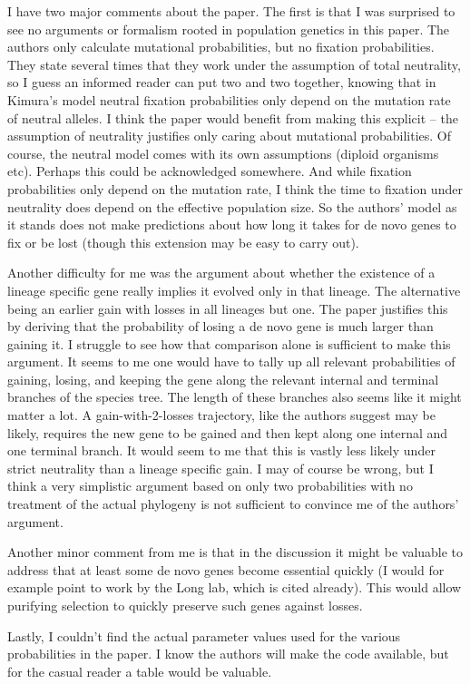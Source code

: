 \documentclass[12pt,a4paper]{article}
\begin{document}
I have two major comments about the paper. The first is that I was surprised to see no arguments or formalism rooted in population genetics in this paper. The authors only calculate mutational probabilities, but no fixation probabilities. They state several times that they work under the assumption of total neutrality, so I guess an informed reader can put two and two together, knowing that in Kimura's model neutral fixation probabilities only depend on the mutation rate of neutral alleles. I think the paper would benefit from making this explicit -- the assumption of neutrality justifies only caring about mutational probabilities. Of course, the neutral model comes with its own assumptions (diploid organisms  etc). Perhaps this could be acknowledged somewhere. And while fixation probabilities only depend on the mutation rate, I think the time to fixation under neutrality does depend on the effective population size. So the authors' model as it stands does not make predictions about how long it takes for de novo genes to fix or be lost (though this extension may be easy to carry out).

Another difficulty for me was the argument about whether the existence of a lineage specific gene really implies it evolved only in that lineage. The alternative being an earlier gain with losses in all lineages but one. The paper justifies this by deriving that the probability of losing a de novo gene is much larger than gaining it. I struggle to see how that comparison alone is sufficient to make this argument. It seems to me one would have to tally up all relevant probabilities of gaining, losing, and keeping the gene along the relevant internal and terminal branches of the species tree. The length of these branches also seems like it might matter a lot. A gain-with-2-losses trajectory, like the authors suggest may be likely, requires the new gene to be gained and then kept along one internal and one terminal branch. It would seem to me that this is vastly less likely under strict neutrality than a lineage specific gain. I may of course be wrong, but I think a very simplistic argument based on only two probabilities with no treatment of the actual phylogeny is not sufficient to convince me of the authors' argument.

Another minor comment from me is that in the discussion it might be valuable to address that at least some de novo genes become essential quickly (I would for example point to work by the Long lab, which is cited already). This would allow purifying selection to quickly preserve such genes against losses.

Lastly, I couldn't find the actual parameter values used for the various probabilities in the paper. I know the authors will make the code available, but for the casual reader a table would be valuable.
\end{document}
